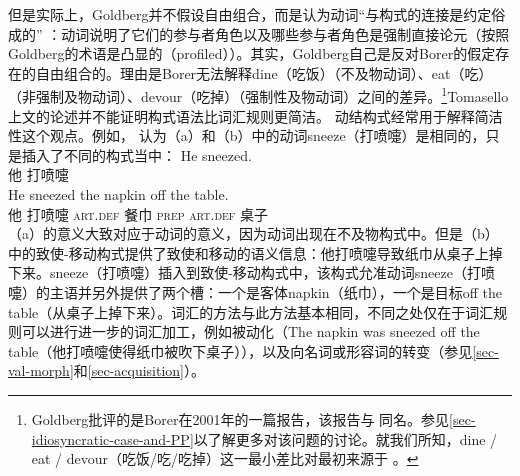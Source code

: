 \noindent
    但是实际上，Goldberg并不假设自由组合，而是认为动词“与构式的连接是约定俗成的” \citep[]{Goldberg95a}：动词说明了它们的参与者角色以及哪些参与者角色是强制直接论元（按照Goldberg的术语是凸显的（profiled））。其实，Goldberg自己\citeyearpar[]{Goldberg2006a}是反对Borer的假定存在的自由组合的\citeyearpar{Borer2003a-u}。理由是Borer无法解释dine（吃饭）（不及物动词）、eat（吃）（非强制及物动词）、devour（吃掉）（强制性及物动词）之间的差异。\footnote{Goldberg批评的是Borer在2001年的一篇报告，该报告与 同名。参见\ref{sec-idiosyncratic-case-and-PP}以了解更多对该问题的讨论。就我们所知，dine / eat / devour（吃饭/吃/吃掉）这一最小差比对最初来源于 \citet[--90]{Dowty89b-u}。}Tomasello上文的论述并不能证明构式语法比词汇规则更简洁。
    动结构式经常用于解释简洁性这个观点。例如， \citet[\S~7]{Goldberg95a}认为（a）和（b）中的动词sneeze（打喷嚏）是相同的，只是插入了不同的构式当中：
\eal
\ex 
\gll He sneezed.\\
他 打喷嚏\\
\ex 
\gll He sneezed the napkin off the table.\\
他 打喷嚏 \textsc{art}.\textsc{def} 餐巾 \textsc{prep} \textsc{art}.\textsc{def} 桌子 \\
\zl
（a）的意义大致对应于动词的意义，因为动词出现在不及物构式中。但是（b）中的致使-移动构式提供了致使和移动的语义信息：他打喷嚏导致纸巾从桌子上掉下来。sneeze（打喷嚏）插入到致使-移动构式中，该构式允准动词sneeze（打喷嚏）的主语并另外提供了两个槽：一个是客体napkin（纸巾），一个是目标off the table（从桌子上掉下来）。词汇的方法与此方法基本相同，不同之处仅在于词汇规则可以进行进一步的词汇加工，例如被动化（The napkin was sneezed off the table（他打喷嚏使得纸巾被吹下桌子）），以及向名词或形容词的转变（参见\ref{sec-val-morph}和\ref{sec-acquisition}）。   
